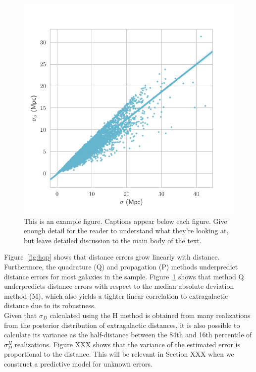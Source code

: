 \documentclass[a4paper,fleqn,usenatbib]{mnras}
\begin{document}
\begin{figure}

	\includegraphics[scale=0.7]{ee}
    \caption{This is an example figure. Captions appear below each figure.
	Give enough detail for the reader to understand what they're looking at,
	but leave detailed discussion to the main body of the text.}
    \label{fig:qm}
\end{figure}

Figure~\ref{fig:hqp} shows that distance errors grow linearly with distance. Furthermore, the quadrature (Q) and propagation (P) methods underpredict distance errors for most galaxies in the sample. Figure~\ref{fig:qm} shows that method Q underpredicts distance errors with respect to the median absolute deviation method (M), which also yields a tighter linear correlation to extragalactic distance due to its robustness.\\

Given that $\sigma_D$ calculated using the H method is obtained from many realizations from the posterior distribution of extragalactic distances, it is also possible to calculate its variance as the half-distance between the 84th and 16th percentile of $\sigma_D^H$ realizations. Figure XXX shows that the variance of the estimated error is proportional to the distance. This will be relevant in Section XXX when we construct a predictive model for unknown errors.\\
\end{document}
